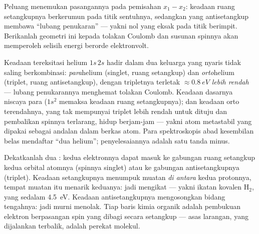 \begin{omfigure}

{\small Peluang menemukan pasangannya pada pemisahan $x_1 - x_2$:
keadaan ruang setangkupnya berkerumun pada titik sentuhnya, sedangkan
yang antisetangkup membawa ``lubang penukaran'' --- yakni nol yang eksak
pada titik berimpit. Berikanlah geometri ini kepada tolakan Coulomb dan
susunan spinnya akan memperoleh selisih energi berorde elektronvolt.}
\end{omfigure}

\begin{example}\label{ex:b3:identical-particles:helium}
Keadaan tereksitasi helium $1s\,2s$ hadir dalam dua keluarga yang nyaris
tidak saling berkombinasi: \emph{para}helium (singlet, ruang setangkup)
dan \emph{orto}helium (triplet, ruang antisetangkup), dengan tripletnya
terletak $\approx\qty{0.8}{eV}$ \emph{lebih rendah} --- lubang
penukarannya menghemat tolakan Coulomb. Keadaan dasarnya niscaya para
($1s^2$ memaksa keadaan ruang setangkupnya); dan keadaan orto
terendahnya, yang tak mempunyai triplet lebih rendah untuk dituju dan
pembalikan spinnya terlarang, hidup berjam-jam --- yakni atom metastabil
yang dipakai sebagai andalan dalam berkas atom. Para spektroskopis abad
kesembilan belas mendaftar ``dua helium''; penyelesaiannya adalah satu
tanda minus.
\end{example}

\begin{example}\label{ex:b3:identical-particles:bond}
Dekatkanlah dua : kedua elektronnya dapat masuk ke gabungan
ruang setangkup kedua orbital atomnya (spinnya singlet) atau ke gabungan
antisetangkupnya (triplet). Keadaan setangkupnya menumpuk muatan
\emph{di antara} kedua protonnya, tempat muatan itu menarik keduanya:
jadi mengikat --- yakni ikatan kovalen H$_2$, yang sedalam \qty{4.5}{eV}.
Keadaan antisetangkupnya mengosongkan bidang tengahnya: jadi murni
menolak. Tiap baris kimia organik adalah pembukuan elektron berpasangan
spin yang dibagi secara setangkup --- asas larangan, yang dijalankan
terbalik, adalah perekat molekul.
\end{example}

